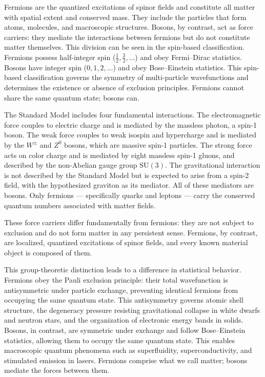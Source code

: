 Fermions are the quantized excitations of spinor fields and constitute all matter with spatial extent and conserved mass. They include the particles that form atoms, molecules, and macroscopic structures. Bosons, by contrast, act as force carriers: they mediate the interactions between fermions but do not constitute matter themselves. This division can be seen in the spin-based classification. Fermions possess half-integer spin ($\tfrac{1}{2}, \tfrac{3}{2}, \ldots$) and obey Fermi–Dirac statistics. Bosons have integer spin ($0, 1, 2, \ldots$) and obey Bose–Einstein statistics. This spin-based classification governs the symmetry of multi-particle wavefunctions and determines the existence or absence of exclusion principles. Fermions cannot share the same quantum state; bosons can.

The Standard Model includes four fundamental interactions. The electromagnetic force couples to electric charge and is mediated by the massless photon, a spin-1 boson. The weak force couples to weak isospin and hypercharge and is mediated by the $W^\pm$ and $Z^0$ bosons, which are massive spin-1 particles. The strong force acts on color charge and is mediated by eight massless spin-1 gluons, and described by the non-Abelian gauge group $\mathrm{SU}(3)$. The gravitational interaction is not described by the Standard Model but is expected to arise from a spin-2 field, with the hypothesized graviton as its mediator. All of these mediators are bosons. Only fermions — specifically quarks and leptons — carry the conserved quantum numbers associated with matter fields.

These force carriers differ fundamentally from fermions: they are not subject to exclusion and do not form matter in any persistent sense. Fermions, by contrast, are localized, quantized excitations of spinor fields, and every known material object is composed of them.

This group-theoretic distinction leads to a difference in statistical behavior. Fermions obey the Pauli exclusion principle: their total wavefunction is antisymmetric under particle exchange, preventing identical fermions from occupying the same quantum state. This antisymmetry governs atomic shell structure, the degeneracy pressure resisting gravitational collapse in white dwarfs and neutron stars, and the organization of electronic energy bands in solids. Bosons, in contrast, are symmetric under exchange and follow Bose–Einstein statistics, allowing them to occupy the same quantum state. This enables macroscopic quantum phenomena such as superfluidity, superconductivity, and stimulated emission in lasers. Fermions comprise what we call matter; bosons mediate the forces between them.

